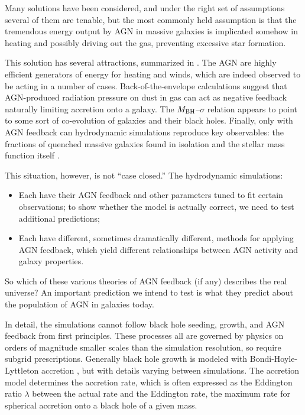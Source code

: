 \documentclass[12pt, preprint]{hacked-aastex}
\begin{document}
Many solutions have been considered, and under the right set of
assumptions several of them are tenable, but the most commonly held
assumption is that the tremendous energy output by AGN in massive
galaxies is implicated somehow in heating and possibly driving out the
gas, preventing excessive star formation.

This solution has several attractions, summarized in
\cite{fabian12}. The AGN are highly efficient generators of energy for
heating and winds, which are indeed observed to be acting in a number
of cases. Back-of-the-envelope calculations suggest that AGN-produced
radiation pressure on dust in gas can act as negative feedback
naturally limiting accretion onto a galaxy. The $M_{\rm BH}$--$\sigma$
relation appears to point to some sort of co-evolution of galaxies and
their black holes. Finally, only with AGN feedback can hydrodynamic
simulations reproduce key observables: the fractions of quenched
massive galaxies found in isolation and the stellar mass function
itself \cite{somerville15a, wellons22a}.

This situation, however, is not ``case closed.'' The hydrodynamic
simulations:
\begin{itemize}
\item Each have their AGN feedback and other parameters tuned to fit
  certain observations; to show whether the model is actually correct,
  we need to test additional predictions;
\item Each have different, sometimes dramatically different, methods
  for applying AGN feedback, which yield different relationships
  between AGN activity and galaxy properties.
\end{itemize}
So which of these various theories of AGN feedback (if any) describes
the real universe? An important prediction we intend to test is what
they predict about the population of AGN in galaxies today.

In detail, the simulations cannot follow black hole seeding, growth,
and AGN feedback from first principles. These processes all are
governed by physics on orders of magnitude smaller scales than the
simulation resolution, so require subgrid prescriptions.  Generally
black hole growth is modeled with Bondi-Hoyle-Lyttleton accretion
\cite{edgar04a}, but with details varying between simulations. The
accretion model determines the accretion rate, which is often
expressed as the Eddington ratio $\lambda$ between the actual rate and
the Eddington rate, the maximum rate for spherical accretion onto a
black hole of a given mass.
\end{document}
